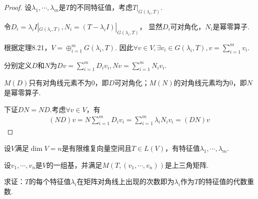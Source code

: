 \begin{proof}
    设\(\lambda_1,\cdots,\lambda_m\)是\(T\)的不同特征值，考虑\(T|_{G(\lambda_i,T)}\).

    令\(D_i=\lambda_i I|_{G(\lambda_i,T)},N_i=(T-\lambda_i I)|_{G(\lambda_i,T)}\)，
    显然\(D_i\)可对角化，\(N_i\)是幂零算子.
    
    根据定理8.21，\(V=\oplus_{i=1}^m G(\lambda_i,T)\).
    因此\(\forall v \in V,\exists v_i \in G(\lambda_i,T),v=\sum_{i=1}^m v_i\).
    
    分别定义\(D\)和\(N\)为\(Dv=\sum_{i=1}^m D_iv_i,Nv=\sum_{i=1}^m N_iv_i\).
    
    \(M(D)\)只有对角线元素不为\(0\)，即\(D\)可对角化；\(M(N)\)的对角线元素均为\(0\)，即\(N\)是幂零算子.
    
    下证\(DN=ND\).考虑\(\forall v \in V\)，有
        \begin{align*}
            (ND)v=N\sum_{i=1}^m D_iv_i=\sum_{i=1}^m \lambda_iN_iv_i=(DN)v
        \end{align*}
\end{proof}

\begin{problem}[11]\label{8.B.11}
    设\(V\)满足\(\dim V=n\)是有限维复向量空间且\(T \in L(V)\)，有特征值\(\lambda_1,\cdots,\lambda_m\).

    设\(v_1,\cdots,v_n\)是\(V\)的一组基，并满足\(M(T,(v_1,\cdots,v_n))\)是上三角矩阵.
    
    求证：\(T\)的每个特征值\(\lambda_i\)在矩阵对角线上出现的次数即为\(\lambda_i\)作为\(T\)的特征值的代数重数.
\end{problem}

